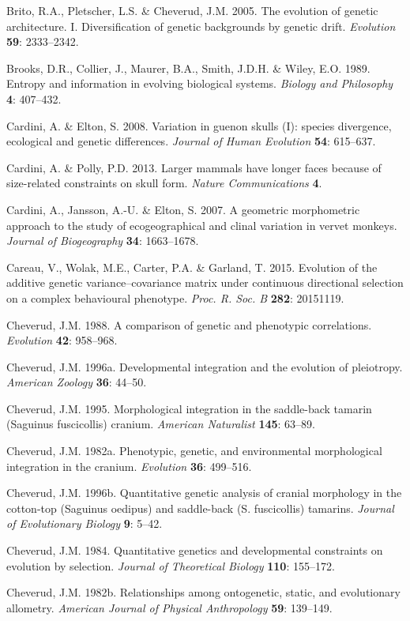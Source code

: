 \documentclass[12pt,twoside]{report}
\begin{document}
Brito, R.A., Pletscher, L.S. \& Cheverud, J.M. 2005. The evolution of
genetic architecture. I. Diversification of genetic backgrounds by
genetic drift. \emph{Evolution} \textbf{59}: 2333--2342.

Brooks, D.R., Collier, J., Maurer, B.A., Smith, J.D.H. \& Wiley, E.O.
1989. Entropy and information in evolving biological systems.
\emph{Biology and Philosophy} \textbf{4}: 407--432.

Cardini, A. \& Elton, S. 2008. Variation in guenon skulls (I): species
divergence, ecological and genetic differences. \emph{Journal of Human
Evolution} \textbf{54}: 615--637.

Cardini, A. \& Polly, P.D. 2013. Larger mammals have longer faces
because of size-related constraints on skull form. \emph{Nature
Communications} \textbf{4}.

Cardini, A., Jansson, A.-U. \& Elton, S. 2007. A geometric morphometric
approach to the study of ecogeographical and clinal variation in vervet
monkeys. \emph{Journal of Biogeography} \textbf{34}: 1663--1678.

Careau, V., Wolak, M.E., Carter, P.A. \& Garland, T. 2015. Evolution of
the additive genetic variance--covariance matrix under continuous
directional selection on a complex behavioural phenotype. \emph{Proc. R.
Soc. B} \textbf{282}: 20151119.

Cheverud, J.M. 1988. A comparison of genetic and phenotypic
correlations. \emph{Evolution} \textbf{42}: 958--968.

Cheverud, J.M. 1996a. Developmental integration and the evolution of
pleiotropy. \emph{American Zoology} \textbf{36}: 44--50.

Cheverud, J.M. 1995. Morphological integration in the saddle-back
tamarin (Saguinus fuscicollis) cranium. \emph{American Naturalist}
\textbf{145}: 63--89.

Cheverud, J.M. 1982a. Phenotypic, genetic, and environmental
morphological integration in the cranium. \emph{Evolution} \textbf{36}:
499--516.

Cheverud, J.M. 1996b. Quantitative genetic analysis of cranial
morphology in the cotton-top (Saguinus oedipus) and saddle-back (S.
fuscicollis) tamarins. \emph{Journal of Evolutionary Biology}
\textbf{9}: 5--42.

Cheverud, J.M. 1984. Quantitative genetics and developmental constraints
on evolution by selection. \emph{Journal of Theoretical Biology}
\textbf{110}: 155--172.

Cheverud, J.M. 1982b. Relationships among ontogenetic, static, and
evolutionary allometry. \emph{American Journal of Physical Anthropology}
\textbf{59}: 139--149.
\end{document}
